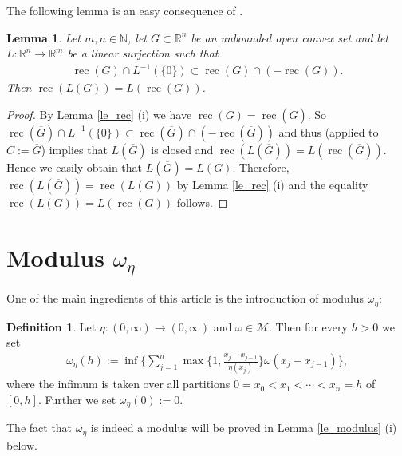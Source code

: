 \documentclass[10pt,a4paper]{amsart}
\newtheorem{lemma}[theorem]{Lemma}
\theoremstyle{definition}
\newtheorem{definition}[theorem]{Definition}
\newcommand{\R}{\mathbb{R}}
\newcommand{\N}{\mathbb{N}}
\newcommand{\M}{\mathcal{M}}
\newcommand{\rec}{\operatorname{rec}}
\begin{document}
The following lemma is an easy consequence of \cite[Theorem 9.1]{R}.
 

\begin{lemma}\label{le_rock}
Let $ m,n\in\N $, let $ G\subset\R^n $ be an unbounded open convex set and let $ L:\R^n\to\R^m $ be a linear surjection such that
\begin{align*}
\rec(G)\cap L^{-1}(\lbrace 0\rbrace)\subset\rec(G)\cap(-\rec(G)).
\end{align*}
Then $ \rec(L(G))=L(\rec(G)) $.
\end{lemma}

\begin{proof}
By Lemma \ref{le_rec} (i) we have $ \rec(G)=\rec(\overline{G}) $. So $ \rec(\overline{G})\cap L^{-1}(\lbrace 0\rbrace)\subset\rec(\overline{G})\cap(-\rec(\overline{G})) $ and thus \cite[Theorem 9.1]{R} (applied to $ C:=\overline{G} $) implies that $ L(\overline{G}) $ is closed and $ \rec(L(\overline{G}))=L(\rec(\overline{G})) $. Hence we easily obtain that $ L(\overline{G})=\overline{L(G)} $. Therefore, $ \rec(L(\overline{G}))=\rec(L(G)) $ by Lemma \ref{le_rec} (i) and the equality $ \rec(L(G))=L(\rec(G)) $ follows.
\end{proof}



\section{Modulus $ \omega_{\eta} $}

One of the main ingredients of this article is the introduction of modulus $ \omega_{\eta} $:

\begin{definition}\label{de_omegaeta}
Let $ \eta:(0,\infty)\to(0,\infty) $ and $ \omega\in\M $. Then for every $ h>0 $ we set
\begin{align}\label{eq_modulus}
\omega_{\eta}(h):=\inf\bigg\lbrace\sum_{j=1}^{n}\max\bigg\lbrace 1,\frac{x_j-x_{j-1}}{\eta(x_j)}\bigg\rbrace\omega(x_j-x_{j-1})\bigg\rbrace,
\end{align}
where the infimum is taken over all partitions $ 0=x_0<x_1<\cdots<x_n=h $ of $ [0,h] $. Further we set $ \omega_{\eta}(0):=0 $.
\end{definition}

The fact that $ \omega_{\eta} $ is indeed a modulus will be proved in Lemma \ref{le_modulus} (i) below.
\end{document}
